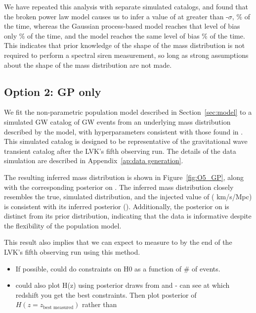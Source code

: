 \documentclass[]{aastex631}
\begin{document}
We have repeated this analysis with  separate simulated catalogs, and found that the broken power law model causes us to infer a  value of \Ho{} at greater than -$\sigma$, \% of the time, whereas the Gaussian process-based model reaches that level of bias only \% of the time, and the \plp{} model reaches the same level of bias \% of the time.
This indicates that prior knowledge of the shape of the mass distribution is not required to perform a spectral siren measurement, so long as strong assumptions about the shape of the mass distribution are not made.

 

\subsection{Option 2: GP only}
We fit the non-parametric population model described in Section~\ref{sec:model} to a simulated GW catalog of GW events from an underlying mass distribution described by the \plp{} model, with hyperparameters consistent with those found in \citet{o3b_pop}.
This simulated catalog is designed to be representative of the gravitational wave transient catalog after the LVK's fifth observing run.
The details of the data simulation are described in Appendix~\ref{ap:data generation}.

The resulting inferred mass distribution is shown in Figure~\ref{fig:O5_GP}, along with the corresponding posterior on \Ho.
The inferred mass distribution closely resembles the true, simulated distribution, and the injected value of \Ho ( km/s/Mpc) is consistent with its inferred posterior ().
Additionally, the posterior on \Ho is distinct from its prior distribution, indicating that the data is informative despite the flexibility of the population model.

This result also implies that we can expect to measure \Ho{} to  by the end of the LVK's fifth observing run using this method.

\begin{itemize}
    \item If possible, could do constraints on H0 as a function of \# of events.
    \item could also plot H(z) using posterior draws from \Ho{} and \Omm{}- can see at which redshift you get the best constraints. Then plot posterior of $H(z=z_{\text{best measured}})$ rather than \Ho {}
\end{itemize}
\end{document}
